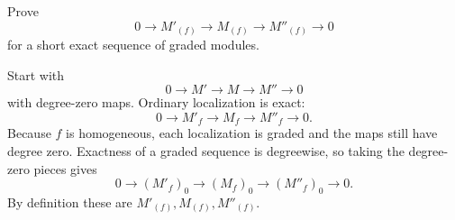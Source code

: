 \begin{problem}\label{prob:vi34-07}
Prove
\[
0\to M'_{(f)}\to M_{(f)}\to M''_{(f)}\to0
\]
for a short exact sequence of graded modules.
\end{problem}

\ifdefined\FullProblemDossiers
\begin{solution}
Start with
\[
0\to M'\to M\to M''\to0
\]
with degree-zero maps. Ordinary localization is exact:
\[
0\to M'_f\to M_f\to M''_f\to0.
\]
Because \(f\) is homogeneous, each localization is graded and the maps still have degree zero. Exactness of a
graded sequence is degreewise, so taking the degree-zero pieces gives
\[
\boxed{
0\to(M'_f)_0\to(M_f)_0\to(M''_f)_0\to0.
}
\]
By definition these are \(M'_{(f)},M_{(f)},M''_{(f)}\).
\end{solution}
\fi
